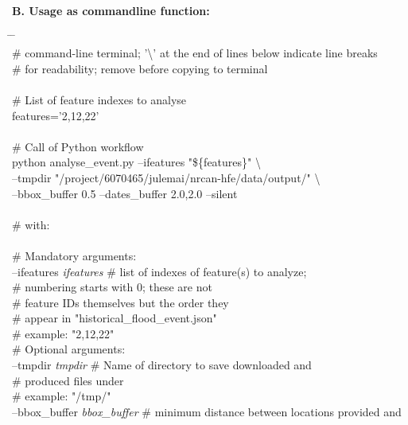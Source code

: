 \documentclass[10pt,a4paper,titlepage,parskip]{scrartcl}
\newenvironment{ttfont}{\fontfamily{\ttdefault}\selectfont}{\par}
\newcommand{\GRAU}[1]{\textcolor{ufzgray2}{#1}}
\begin{document}
\textbf{B. Usage as commandline function:}
\begin{framed}
	\vspace*{-1.2cm}
	\begin{ttfont}
		\begin{tabbing}
			\hspace{0.5cm} \= \hspace{5.2cm} \= \kill \\[4pt]
			\GRAU{\# command-line terminal; '\textbackslash' at the end of lines below indicate line breaks}\\
			\GRAU{\# for readability; remove before copying to terminal}\\
			\\
			\GRAU{\# List of feature indexes to analyse}\\
			features='2,12,22'\\
			\\
			\GRAU{\# Call of Python workflow}\\
			python analyse\_event.py --ifeatures "\$\{features\}" \textbackslash \\
			\> --tmpdir "/project/6070465/julemai/nrcan-hfe/data/output/" \textbackslash \\
			\> --bbox\_buffer 0.5 --dates\_buffer 2.0,2.0 --silent\\
			\\
			\GRAU{\# with:}\\
			\\
			\> \GRAU{\# Mandatory arguments:}\\
			\> --ifeatures \textit{ifeatures} \> \GRAU{\# list of indexes of feature(s) to analyze;}\\
			\> \> \GRAU{\# numbering starts with 0; these are not }\\
			\> \> \GRAU{\# feature IDs themselves but the order they }\\
			\> \> \GRAU{\# appear in "historical\_flood\_event.json"}\\
			\> \> \GRAU{\# example: "2,12,22"}\\
			\> \GRAU{\# Optional arguments:}\\
			\> --tmpdir \textit{tmpdir} \> \GRAU{\# Name of directory to save downloaded and}\\
			\> \> \GRAU{\# produced files under}\\
			\> \> \GRAU{\# example: "/tmp/"}\\
			\> --bbox\_buffer \textit{bbox\_buffer} \> \GRAU{\# minimum distance between locations provided and}\\

\end{tabbing}
\end{ttfont}
\end{framed}
\end{document}
